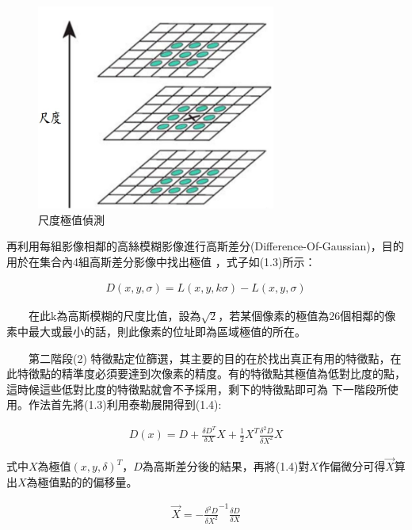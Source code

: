 \begin{figure}
\begin{center}
  \includegraphics[width=0.7\textwidth]{figures/extreme_value_detect.jpg}
  \caption{尺度極值偵測}
  \label{fig:Extreme Value Detect}
\end{center}
\end{figure}  

    再利用每組影像相鄰的高絲模糊影像進行高斯差分(Difference-Of-Gaussian)，目的用於在集合內4組高斯差分影像中找出極值
    ，式子如(1.3)所示：
    
\begin{align}
  D(x,y,\sigma) = L(x,y,k\sigma)-L(x,y,\sigma)
\end{align}

　　在此k為高斯模糊的尺度比值，設為$\sqrt{2}$，若某個像素的極值為26個相鄰的像素中最大或最小的話，則此像素的位址即為區域極值的所在。

　　第二階段(2) 特徵點定位篩選，其主要的目的在於找出真正有用的特徵點，在此特徵點的精準度必須要達到次像素的精度。有的特徵點其極值為低對比度的點，這時候這些低對比度的特徵點就會不予採用，剩下的特徵點即可為
下一階段所使用。作法首先將(1.3)利用泰勒展開得到(1.4):
 
\begin{align}
  D(x) = D + \frac{\delta D^T}{\delta X}X + \frac{1}{2}X^T\frac{\delta^2 D}{\delta X^2}X
\end{align}

   式中$X$為極值$(x,y,\delta)^T$，$D$為高斯差分後的結果，再將(1.4)對$X$作偏微分可得$\vec{X}$算出$X$為極值點的的偏移量。
   
\begin{align}
  \vec{X} = -\frac{\delta^2 D}{\delta X^2}^{-1}\frac{\delta D}{\delta X}
\end{align}   
   
